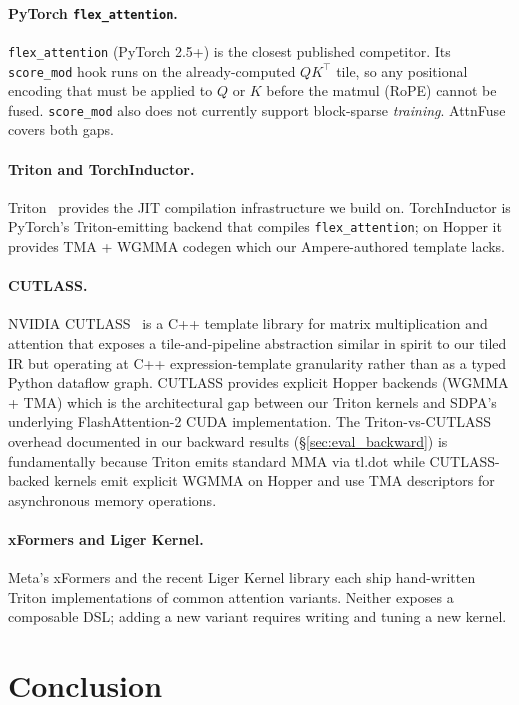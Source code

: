 \documentclass[10pt,twocolumn]{article}
\begin{document}
\paragraph{PyTorch \texttt{flex\_attention}.}
\texttt{flex\_attention} (PyTorch 2.5+) is the closest published
competitor. Its \texttt{score\_mod} hook runs on the already-computed
$QK^\top$ tile, so any positional encoding that must be applied to $Q$
or $K$ before the matmul (RoPE) cannot be fused. \texttt{score\_mod}
also does not currently support block-sparse \emph{training}. AttnFuse
covers both gaps.

\paragraph{Triton and TorchInductor.}
Triton~\cite{tillet2019triton} provides the JIT compilation
infrastructure we build on. TorchInductor is PyTorch's Triton-emitting
backend that compiles \texttt{flex\_attention}; on Hopper it provides
TMA + WGMMA codegen which our Ampere-authored template lacks.

\paragraph{CUTLASS.}
NVIDIA CUTLASS~\cite{thakkar2023cutlass} is a C++ template library for
matrix multiplication and attention that exposes a tile-and-pipeline
abstraction similar in spirit to our tiled IR but operating at C++
expression-template granularity rather than as a typed Python dataflow
graph. CUTLASS provides explicit Hopper backends (WGMMA + TMA) which
is the architectural gap between our Triton kernels and SDPA's
underlying FlashAttention-2 CUDA implementation. The Triton-vs-CUTLASS
overhead documented in our backward results (\S\ref{sec:eval_backward})
is fundamentally because Triton emits standard MMA via tl.dot while
CUTLASS-backed kernels emit explicit WGMMA on Hopper and use TMA
descriptors for asynchronous memory operations.

\paragraph{xFormers and Liger Kernel.}
Meta's xFormers and the recent Liger Kernel library each ship
hand-written Triton implementations of common attention variants.
Neither exposes a composable DSL; adding a new variant requires
writing and tuning a new kernel.

\section{Conclusion}
\end{document}
